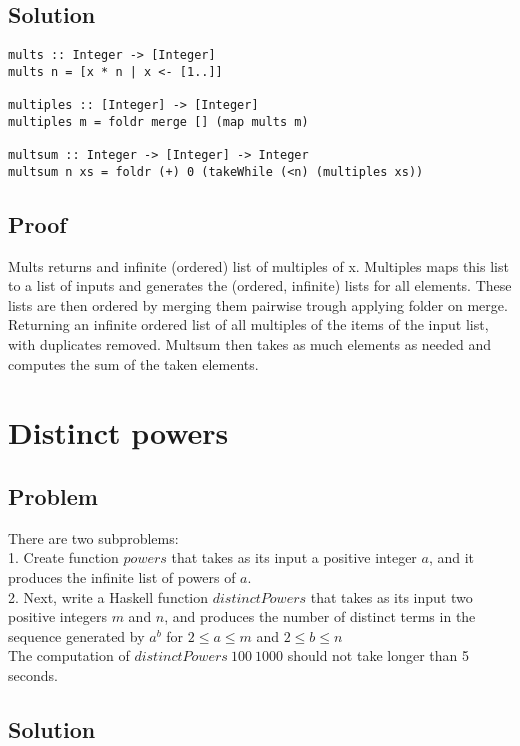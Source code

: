 \documentclass[a4paper,11pt]{article}
\begin{document}
\subsection{Solution}

\begin{lstlisting}
mults :: Integer -> [Integer]
mults n = [x * n | x <- [1..]]

multiples :: [Integer] -> [Integer]
multiples m = foldr merge [] (map mults m)

multsum :: Integer -> [Integer] -> Integer
multsum n xs = foldr (+) 0 (takeWhile (<n) (multiples xs))
\end{lstlisting}

\subsection{Proof}

Mults returns and infinite (ordered) list of multiples of x. Multiples maps this list to a list of inputs and generates the (ordered, infinite) lists for all elements. These lists are then ordered by merging them pairwise trough applying folder on merge. Returning an infinite ordered list of all multiples of the items of the input list, with duplicates removed. Multsum then takes as much elements as needed and computes the sum of the taken elements.

\section{Distinct powers}
\subsection{Problem}
There are two subproblems:\\
1. Create function $powers$ that takes as its input a positive integer $a$, and it produces the infinite
list of powers of $a$.\\
2. Next, write a Haskell function $distinctPowers$ that takes as its input two positive integers $m$ and
$n$, and produces the number of distinct terms in the sequence generated by $a^b$ for $2 \leq a \leq m$ and $2 \leq b \leq n$\\
The computation of $distinctPowers\: 100\: 1000$ should not take longer than 5 seconds.
\subsection{Solution}
\end{document}

